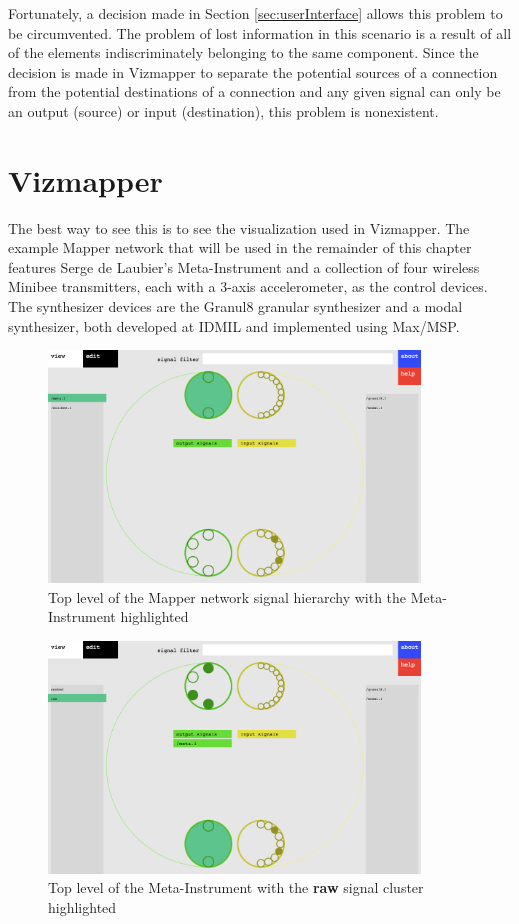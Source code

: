 Fortunately, a decision made in Section \ref{sec:userInterface} allows this problem to be circumvented. The problem of lost information in this scenario is a result of all of the elements indiscriminately belonging to the same component. Since the decision is made in Vizmapper to separate the potential sources of a connection from the potential destinations of a connection and any given signal can only be an output (source) or input (destination), this problem is nonexistent.

\section{Vizmapper}

The best way to see this is to see the visualization used in Vizmapper. The example Mapper network that will be used in the remainder of this chapter features Serge de Laubier's Meta-Instrument \cite{metainstrument1998} and a collection of four wireless Minibee transmitters, each with a 3-axis accelerometer, as the control devices. The synthesizer devices are the Granul8 granular synthesizer and a modal synthesizer, both developed at IDMIL and implemented using Max/MSP. 

\begin{figure}[p]
\centering
\includegraphics[width=0.88\textwidth]{vizmapperFirst.png}
\caption{Top level of the Mapper network signal hierarchy with the Meta-Instrument highlighted}
\label{fig:vizOne}
\end{figure}

\begin{figure}[p]
\centering
\includegraphics[width=0.88\textwidth]{vizmapperSecond.png}
\caption{Top level of the Meta-Instrument with the \textbf{raw} signal cluster highlighted}
\label{fig:vizTwo}
\end{figure}

